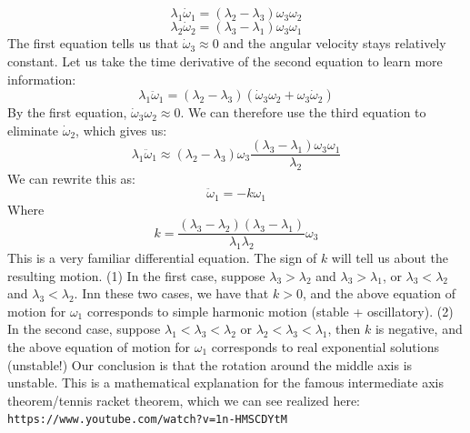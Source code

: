 \[\lambda_1\dot{\omega}_1 = (\lambda_2 - \lambda_3)\omega_3\omega_2\]
\[\lambda_2\dot{\omega}_2 = (\lambda_3 - \lambda_1)\omega_3\omega_1\]
The first equation tells us that $\dot{\omega}_3 \approx 0$ and the angular velocity stays relatively constant. Let us take the time derivative of the second equation to learn more information:
\[\lambda_1\ddot{\omega}_1 = (\lambda_2 - \lambda_3)(\dot{\omega}_3\omega_2 + \omega_3\dot{\omega}_2)\]
By the first equation, $\dot{\omega}_3\omega_2 \approx 0$. We can therefore use the third equation to eliminate $\dot{\omega}_2$, which gives us:
\[\lambda_1 \ddot{\omega}_1 \approx (\lambda_2 - \lambda_3)\omega_3\frac{(\lambda_3 - \lambda_1)\omega_3\omega_1}{\lambda_2}\]
We can rewrite this as:
\[\ddot{\omega}_1 = -k\omega_1\]
Where
\[k = \frac{(\lambda_3 - \lambda_2)(\lambda_3 - \lambda_1)}{\lambda_1\lambda_2}\omega_3\]
This is a very familiar differential equation. The sign of $k$ will tell us about the resulting motion.
\newline (1) In the first case, suppose $\lambda_3 > \lambda_2$ and $\lambda_3 > \lambda_1$, or $\lambda_3 < \lambda_2$ and $\lambda_3 < \lambda_2$. Inn these two cases, we have that $k > 0$, and the above equation of motion for $\omega_1$ corresponds to simple harmonic motion (stable + oscillatory). 
\newline (2) In the second case, suppose $\lambda_1 < \lambda_3 < \lambda_2$ or $\lambda_2 < \lambda_3 < \lambda_1$, then $k$ is negative, and the above equation of motion for $\omega_1$ corresponds to real exponential solutions (unstable!)
\newline Our conclusion is that the rotation around the middle axis is unstable. This is a mathematical explanation for the famous intermediate axis theorem/tennis racket theorem, which we can see realized here: \\ \texttt{https://www.youtube.com/watch?v=1n-HMSCDYtM}